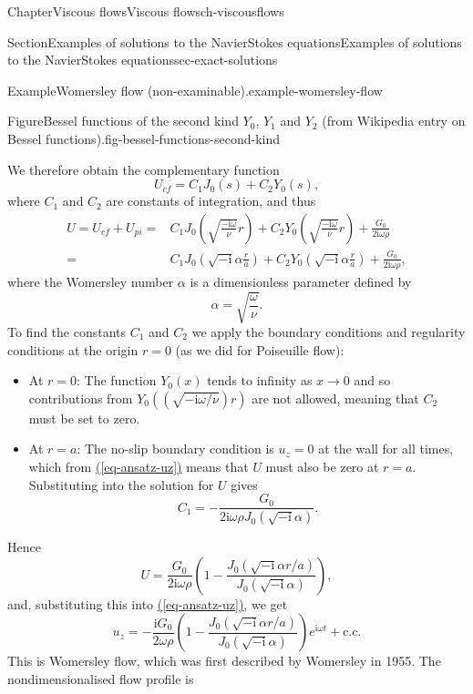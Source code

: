 \documentclass[oneside,10pt,]{book}
\newcommand{\xreffont}{\relax}
\newcommand{\ptxlistdisc}{\raisebox{0.3ex}{\textbullet}}
\numberwithin{equation}{section}
\newcommand{\im}{\mathrm{i}}
\begin{document}
\begin{chapterptx}{Chapter}{Viscous flows}{}{Viscous flows}{}{}{ch-viscousflows}
\begin{sectionptx}{Section}{Examples of solutions to the Navier\textendash{}Stokes equations}{}{Examples of solutions to the Navier\textendash{}Stokes equations}{}{}{sec-exact-solutions}
\begin{example}{Example}{Womersley flow (non-examinable).}{example-womersley-flow}
\begin{figureptx}{Figure}{Bessel functions of the second kind \(Y_0\), \(Y_1\) and \(Y_2\) (from Wikipedia entry on Bessel functions).}{fig-bessel-functions-second-kind}{}
\tcblower
\end{figureptx}%
We therefore obtain the complementary function%
\begin{equation*}
U_{cf}=C_1J_0(s)+C_2Y_0(s),
\end{equation*}
where \(C_1\) and \(C_2\) are constants of integration, and thus%
\begin{align*}
U=U_{cf}+U_{pi}
=&C_1J_0\left(\sqrt{\frac{-\im\omega}{\nu}}r\right)+C_2Y_0\left(\sqrt{\frac{-\im\omega}{\nu}}r\right)+\frac{G_0}{2\im\omega\rho}\\
=&C_1J_0\left(\sqrt{-\im}\alpha\frac{r}{a}\right)+C_2Y_0\left(\sqrt{-\im}\alpha\frac{r}{a}\right)+\frac{G_0}{2\im\omega\rho},
\end{align*}
where the Womersley number \(\alpha\) is a dimensionless parameter defined by%
\begin{equation*}
\alpha=\sqrt{\frac{\omega}{\nu}}.
\end{equation*}
To find the constants \(C_1\) and \(C_2\) we apply the boundary conditions and regularity conditions at the origin \(r=0\) (as we did for Poiseuille flow):%
\begin{itemize}[label=\ptxlistdisc]
\item{}At \(r=0\): The function \(Y_0(x)\) tends to infinity as \(x\rightarrow0\) and so contributions from \(Y_0((\sqrt{-\im\omega/\nu})r)\) are not allowed, meaning that \(C_2\) must be set to zero.%
\item{}At \(r=a\): The no-slip boundary condition is \(u_z=0\) at the wall for all times, which from \hyperref[eq-ansatz-uz]{({\xreffont\ref{eq-ansatz-uz}})} means that \(U\) must also be zero at \(r=a\). Substituting into the solution for \(U\) gives%
\begin{equation*}
C_1=-\frac{G_0}{2\im\omega\rho J_0(\sqrt{-\im}\alpha)}.
\end{equation*}
%
\end{itemize}
Hence%
\begin{equation*}
U=\frac{G_0}{2\im\omega\rho}\left(1-\frac{J_0(\sqrt{-\im}\alpha r/a)}{J_0(\sqrt{-\im}\alpha)}\right),
\end{equation*}
and, substituting this into \hyperref[eq-ansatz-uz]{({\xreffont\ref{eq-ansatz-uz}})}, we get%
\begin{equation}
u_z=-\frac{\im G_0}{2\omega\rho}\left(1-\frac{J_0(\sqrt{-\im}\alpha r/a)}{J_0(\sqrt{-\im}\alpha)}\right)e^{\im\omega t}+\mathrm{c.c.}\label{eq-womsersley-flow}
\end{equation}
This is Womersley flow, which was first described by Womersley in 1955. The nondimensionalised flow profile is%

\end{example}
\end{sectionptx}
\end{chapterptx}
\end{document}
